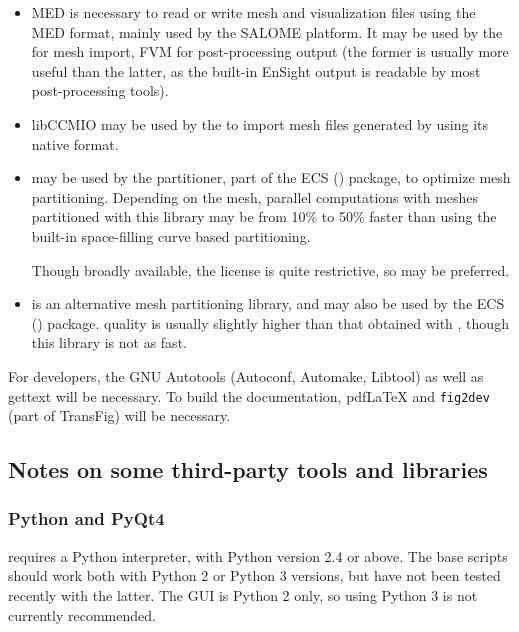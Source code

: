 \documentclass[a4paper,10pt,twoside]{article}
\begin{document}
\begin{itemize}
\item MED is necessary to read or write mesh and visualization files
      using the MED format, mainly used by the SALOME platform.
      It may be used by the \pcs for mesh import, FVM for
      post-processing output (the former is usually more useful than
      the latter, as the built-in EnSight output is readable by most
      post-processing tools).

\item libCCMIO may be used by the \pcs to import mesh files generated by
      \starccmp using its native format.

\item \metis  may be used by the partitioner, part of the ECS (\pcs)
      package, to optimize mesh partitioning.
      Depending on the mesh, parallel computations with meshes partitioned
      with this library may be from 10\% to 50\% faster than using the
      built-in space-filling curve based partitioning.

      Though broadly available, the license is quite restrictive,
      so \scotch may be preferred.

\item \scotch is an alternative mesh partitioning library, and may also
      be used by the ECS (\pcs) package.
      quality is usually slightly higher than that obtained with \metis,
      though this library is not as fast.

\end{itemize}

For developers, the GNU Autotools (Autoconf, Automake, Libtool) as
well as gettext will be necessary. To build the documentation,
pdf\LaTeX{} and \texttt{fig2dev} (part of TransFig) will be necessary.

\subsection{Notes on some third-party tools and libraries}

\subsubsection{Python and PyQt4\label{sec:ext:python}}

\CS requires a Python interpreter, with Python version 2.4 or above.
The base scripts should work both with Python 2 or Python 3 versions,
but have not been tested recently with the latter. The GUI is Python 2
only, so using Python 3 is not currently recommended.
\end{document}
